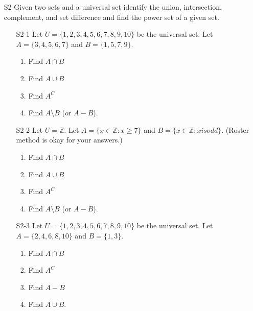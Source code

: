 \documentclass[11pt]{article}
\newcommand{\Z}{\mathbb{Z}}
\begin{document}
\begin{itemize}
\item[S2] Given two sets and a universal set identify the union, intersection, complement, and set difference and find the power set of a given set.
	\begin{enumerate}
	\item[S2-1] Let $U = \{1,2,3,4,5,6,7,8,9,10\}$ be the universal set. Let $A = \{3,4,5,6,7\}$ and $B=\{1,5,7,9\}$.
		\begin{enumerate}
		\item Find $A\cap B$
		\item Find $A \cup B$
		\item Find $A^C$
		\item Find $A\setminus B$ (or $A-B$).
		\end{enumerate}
	\item[S2-2]  Let $U = \Z$. Let $A = \{x\in \Z: x\ge 7\}$ and $B = \{x\in\Z: x is odd\}$.  (Roster method is okay for your answers.)
		\begin{enumerate}
		\item Find $A\cap B$
		\item Find $A \cup B$
		\item Find $A^C$
		\item Find $A\setminus B$ (or $A-B$).
		\end{enumerate}
	\item[S2-3]  Let $U = \{1,2,3,4,5,6,7,8,9,10\}$ be the universal set.  Let $A= \{2,4,6,8,10\}$ and $B = \{1,3\}$.
		\begin{enumerate}
		\item Find $A\cap B$
		\item Find $A^C$
		\item Find  $A-B$
		\item Find $A\cup B$.
		\end{enumerate}
	\end{enumerate}
	
\newpage


\end{itemize}
\end{document}
